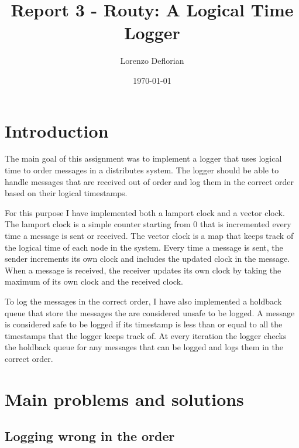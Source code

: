 \documentclass[a4paper, 11pt]{article}
\title{Report 3 - Routy: A Logical Time Logger}
\author{Lorenzo Deflorian}
\date{\today{}}
\begin{document}
\maketitle

\section{Introduction}

The main goal of this assignment was to implement a logger that uses logical time to order messages in a distributes system. The logger should be able to handle messages that are received out of order and log them in the correct order based on their logical timestamps.

For this purpose I have implemented both a lamport clock and a vector clock. The lamport clock is a simple counter starting from 0 that is incremented every time a message is sent or received. The vector clock is a map that keeps track of the logical time of each node in the system. Every time a message is sent, the sender increments its own clock and includes the updated clock in the message. When a message is received, the receiver updates its own clock by taking the maximum of its own clock and the received clock.

To log the messages in the correct order, I have also implemented a holdback queue that store the messages the are considered unsafe to be logged. A message is considered safe to be logged if its timestamp is less than or equal to all the timestamps that the logger keeps track of. At every iteration the logger checks the holdback queue for any messages that can be logged and logs them in the correct order.


\section{Main problems and solutions}

\subsection{Logging wrong in the order}
\end{document}
